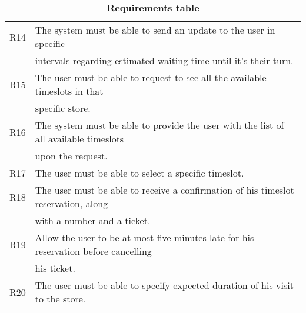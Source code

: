 \begin{table}[H]
\begin{flushleft}
\begin{tabular}{|l|l|}
\hline
R14&The system must be able to send an update to the user in specific \\ & intervals regarding estimated waiting time until it's their turn.\\
\hline
R15&The user must be able to request to see all the available timeslots  in that \\ & specific store.\\
\hline
R16&The system must be able to provide the user with the list of all available timeslots \\ & upon the request.\\
\hline
R17&The user must be able to select a specific timeslot.\\
\hline
R18&The user must be able to receive a confirmation of his timeslot reservation, along \\ & with a number and a ticket.\\
\hline
R19&Allow the user to be at most five minutes late for his reservation before cancelling \\ &  his ticket.\\
\hline
R20&The user must be able to specify expected duration of his visit to the store.\\
\hline
\end{tabular}
\end{flushleft}
\caption{\textbf{Requirements table}}
\label{tab:reqtable}
\end{table}

